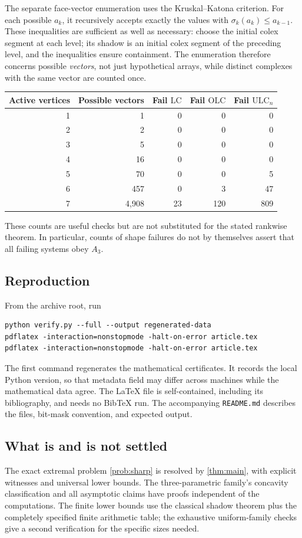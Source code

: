 \documentclass[11pt,letterpaper]{article}
\numberwithin{equation}{section}
\theoremstyle{definition}
\theoremstyle{remark}
\newcommand{\LC}{\mathrm{LC}}
\newcommand{\OLC}{\mathrm{OLC}}
\newcommand{\ULC}{\mathrm{ULC}}
\begin{document}
The separate face-vector enumeration uses the Kruskal--Katona criterion.
For each possible $a_k$, it recursively accepts exactly the values with
$\sigma_k(a_k)\le a_{k-1}$. These inequalities are sufficient as well as
necessary: choose the initial colex segment at each level; its shadow is
an initial colex segment of the preceding level, and the inequalities
ensure containment. The enumeration therefore concerns possible
\emph{vectors}, not just hypothetical arrays, while distinct complexes
with the same vector are counted once.

\begin{center}
\begin{tabular}{@{}r r r r r@{}}
\toprule
Active vertices & Possible vectors & Fail $\LC$ & Fail $\OLC$ & Fail $\ULC_n$\\
\midrule
1&1&0&0&0\\
2&2&0&0&0\\
3&5&0&0&0\\
4&16&0&0&0\\
5&70&0&0&5\\
6&457&0&3&47\\
7&4,908&23&120&809\\
\bottomrule
\end{tabular}
\end{center}
These counts are useful checks but are not substituted for the stated
rankwise theorem. In particular, counts of shape failures do not by
themselves assert that all failing systems obey $A_3$.

\subsection{Reproduction}
From the archive root, run
\begin{lstlisting}[language={}]
python verify.py --full --output regenerated-data
pdflatex -interaction=nonstopmode -halt-on-error article.tex
pdflatex -interaction=nonstopmode -halt-on-error article.tex
\end{lstlisting}
The first command regenerates the mathematical certificates. It records
the local Python version, so that metadata field may differ across
machines while the mathematical data agree. The LaTeX file is
self-contained, including its bibliography, and needs no BibTeX run.
The accompanying \texttt{README.md} describes the files, bit-mask
convention, and expected output.

\subsection{What is and is not settled}
The exact extremal problem \cref{prob:sharp} is resolved by
\cref{thm:main}, with explicit witnesses and universal lower bounds.
The three-parametric family's concavity classification and all asymptotic
claims have proofs independent of the computations. The finite lower
bounds use the classical shadow theorem plus the completely specified
finite arithmetic table; the exhaustive uniform-family checks give a
second verification for the specific sizes needed.
\end{document}
